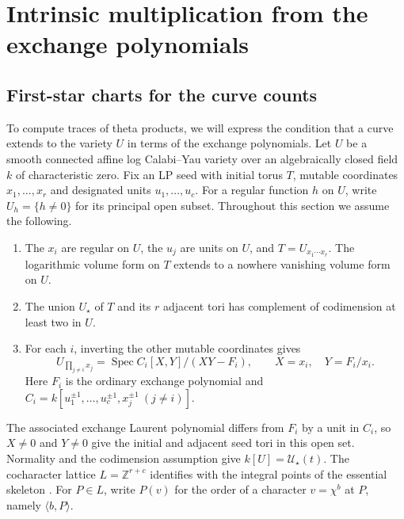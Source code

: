 \documentclass[11pt,reqno]{amsart}
\numberwithin{equation}{section}
\theoremstyle{definition}
\theoremstyle{remark}
\DeclareMathOperator{\Spec}{Spec}
\begin{document}
\section{Intrinsic multiplication from the exchange polynomials}
\label{sec:incidence}

\subsection{First-star charts for the curve counts}\label{subsec:counting-hypotheses}

To compute traces of theta products, we will express the condition that
a curve extends to the variety \(U\) in terms of the exchange polynomials.
Let \(U\) be a smooth connected affine log Calabi--Yau variety over
an algebraically closed field \(k\) of characteristic zero. Fix an LP
seed with initial torus \(T\), mutable coordinates \(x_1,\ldots,x_r\)
and designated units \(u_1,\ldots,u_c\). For a regular function \(h\)
on \(U\), write \(U_h=\{h\ne0\}\) for its principal open subset.
Throughout this section we assume the following.
\begin{enumerate}
\item The \(x_i\) are regular on \(U\), the \(u_j\) are units on \(U\),
and \(T=U_{x_1\cdots x_r}\). The logarithmic volume form on \(T\)
extends to a nowhere vanishing volume form on \(U\).
\item The union \(U_\star\) of \(T\) and its \(r\) adjacent tori
has complement of codimension at least two in \(U\).
\item For each \(i\), inverting the other mutable coordinates gives
\[ U_{\prod_{j\ne i}x_j}=\Spec C_i[X,Y]/(XY-F_i),\qquad X=x_i,\quad Y=F_i/x_i. \]
Here \(F_i\) is the ordinary exchange polynomial and
\(C_i=k[u_1^{\pm1},\ldots,u_c^{\pm1},x_j^{\pm1}\ (j\ne i)]\).
\end{enumerate}
The associated exchange Laurent polynomial differs from \(F_i\) by a
unit in \(C_i\), so \(X\ne0\) and \(Y\ne0\) give the initial and
adjacent seed tori in this open set. Normality and the codimension
assumption give \(k[U]=\mathcal U_\star(t)\). The cocharacter lattice
\(L=\mathbb Z^{r+c}\) identifies with the integral points of the
essential skeleton \cite[Lemma~2.2]{KY}. For \(P\in L\), write
\(P(v)\) for the order of a character \(v=\chi^b\) at \(P\), namely
\(\langle b,P\rangle\).
\end{document}
